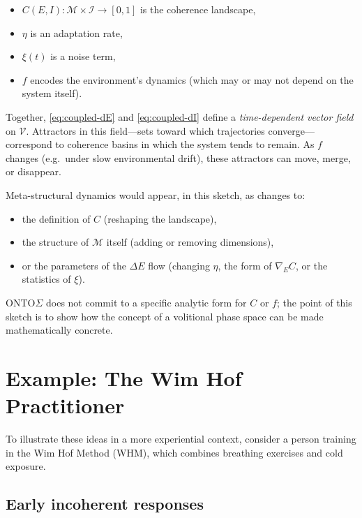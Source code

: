 \documentclass[12pt,a4paper]{report}
\begin{document}
\begin{itemize}[leftmargin=2em]
    \item \(C(E, I) : \mathcal{M} \times \mathcal{I} \to [0,1]\) is the coherence landscape,
    \item \(\eta\) is an adaptation rate,
    \item \(\xi(t)\) is a noise term,
    \item \(f\) encodes the environment's dynamics (which may or may not depend on the system itself).
\end{itemize}

Together, \eqref{eq:coupled-dE} and \eqref{eq:coupled-dI} define a \emph{time-dependent vector field} on \(\mathcal{V}\). Attractors in this field---sets toward which trajectories converge---correspond to coherence basins in which the system tends to remain. As \(f\) changes (e.g.\ under slow environmental drift), these attractors can move, merge, or disappear.

Meta-structural dynamics would appear, in this sketch, as changes to:

\begin{itemize}[leftmargin=2em]
    \item the definition of \(C\) (reshaping the landscape),
    \item the structure of \(\mathcal{M}\) itself (adding or removing dimensions),
    \item or the parameters of the $\Delta E$ flow (changing \(\eta\), the form of \(\nabla_E C\), or the statistics of \(\xi\)).
\end{itemize}

ONTO$\Sigma$ does not commit to a specific analytic form for \(C\) or \(f\); the point of this sketch is to show how the concept of a volitional phase space can be made mathematically concrete.

\section{Example: The Wim Hof Practitioner}

To illustrate these ideas in a more experiential context, consider a person training in the Wim Hof Method (WHM), which combines breathing exercises and cold exposure.

\subsection*{Early incoherent responses}
\end{document}
